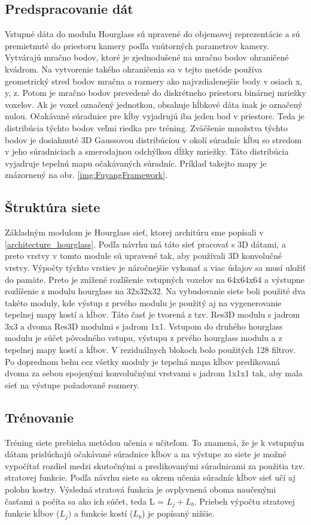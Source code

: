 \subsection{Predspracovanie dát}\label{hourglass:preprocessing}
Vstupné dáta do modulu Hourglass sú upravené do objemovej reprezentácie a sú premietnuté do priestoru kamery podľa vnútorných parametrov kamery. Vytvárajú mračno bodov, ktoré je zjednodušené na mračno bodov ohraničené kvádrom. Na vytvorenie takého ohraničenia sa v tejto metóde používa geometrický stred bodov mračna a rozmery ako najvzdialenejšie body v osiach x, y, z. Potom je mračno bodov prevedené do diskrétneho priestoru binárnej mriežky voxelov. Ak je voxel označený jednotkou, obsahuje hĺbkové dáta inak je označený nulou.
Očakávané súradnice pre kĺby vyjadrujú iba jeden bod v priestore. Teda je distribúcia týchto bodov veľmi riedka pre tréning. Zväčšenie množstva týchto bodov je dosiahnuté 3D Gaussovou distribúciou v okolí súradníc kĺbu so stredom v jeho súradniciach a smerodajnou odchýlkou dĺžky mriežky. Táto distribúcia vyjadruje tepelnú mapu očakávaných súradníc. Príklad takejto mapy je znázornený na obr. \ref{img:FuyangFramework}.

\subsection{Štruktúra siete}
Základným modulom je Hourglass sieť, ktorej architúru sme popísali v \ref{architecture_hourglass}. Podľa návrhu má táto sieť pracovať s 3D dátami, a preto vrstvy v tomto module sú upravené tak, aby používali 3D konvolučné vrstvy. Výpočty týchto vrstiev je náročnejšie vykonať a viac údajov sa musí uložiť do pamäte. Preto je znížené rozlíšenie vstupných voxelov na 64x64x64 a výstupne rozlíšenie z modulu hourglass na 32x32x32. Na vybudovanie siete boli použité dva takéto moduly, kde výstup z prvého modulu je použitý aj na vygenerovanie tepelnej mapy kostí a kĺbov. Táto časť je tvorená z tzv. Res3D modulu s jadrom 3x3 a dvoma Res3D modulmi s jadrom 1x1. Vstupom do druhého hourglass modulu je súčet pôvodného vstupu, výstupu z prvého hourglass modulu a z tepelnej mapy kostí a kĺbov. V reziduálnych blokoch bolo použitých 128 filtrov. Po doprednom behu cez všetky moduly je tepelná mapa kĺbov predikovaná dvoma za sebou spojenými konvolučnými vrstvami s jadrom 1x1x1 tak, aby mala sieť na výstupe požadované rozmery.

\subsection{Trénovanie}
Tréning siete prebieha metódou učenia s učiteľom. To znamená, že je k vstupným dátam prislúchajú očakávané súradnice kĺbov a na výstupe zo siete je možné vypočítať rozdiel medzi skutočnými a predikovanými súradnicami za použitia tzv. stratovej funkcie. Podľa návrhu siete sa okrem učenia súradníc kĺbov sieť učí aj polohu kostry. Výsledná stratová funkcia je ovplyvnená oboma naučenými časťami a počíta sa ako ich súčet, teda L = $L_j + L_b$. Priebeh výpočtu stratovej funkcie kĺbov ($L_j)$ a funkcie kostí ($L_b$) je popísaný nižšie.

